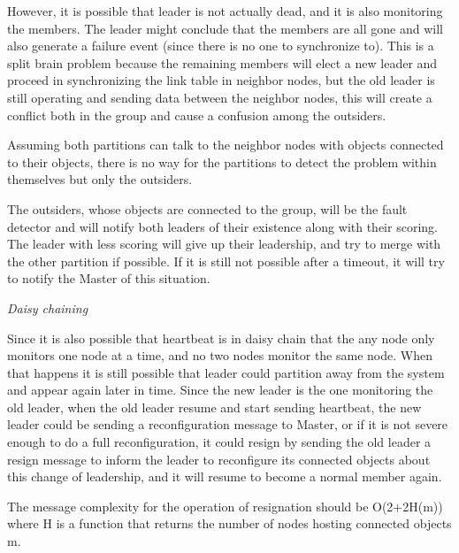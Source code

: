 However, it is possible that leader is not actually dead, and it is also monitoring the members. The leader might conclude that the members are all gone and will also generate a failure event (since there is no one to synchronize to). This is a split brain problem because the remaining members will elect a new leader and proceed in synchronizing the link table in neighbor nodes, but the old leader is still operating and sending data between the neighbor nodes, this will create a conflict both in the group and cause a confusion among the outsiders.

Assuming both partitions can talk to the neighbor nodes with objects connected to their objects, there is no way for the partitions to detect the problem within themselves but only the outsiders.

The outsiders, whose objects are connected to the group, will be the fault detector and will notify both leaders of their existence along with their scoring. The leader with less scoring will give up their leadership, and try to merge with the other partition if possible. If it is still not possible after a timeout, it will try to notify the Master of this situation.

\emph{Daisy chaining}

Since it is also possible that heartbeat is in daisy chain that the any node only monitors one node at a time, and no two nodes monitor the same node. When that happens it is still possible that leader could partition away from the system and appear again later in time. Since the new leader is the one monitoring the old leader, when the old leader resume and start sending heartbeat, the new leader could be sending a reconfiguration message to Master, or if it is not severe enough to do a full reconfiguration, it could resign by sending the old leader a resign message to inform the leader to reconfigure its connected objects about this change of leadership, and it will resume to become a normal member again.

The message complexity for the operation of resignation should be O(2+2H(m)) where H is a function that returns the number of nodes hosting connected objects m.
